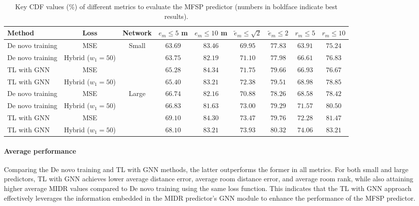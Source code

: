 \begin{table*}[ht]
    \centering
    \caption{Key CDF values (\%) of different metrics to evaluate the MFSP predictor (numbers in boldface indicate best results).}
    \begin{tabular}{lcccccccc}
        \toprule
        Method & Loss & Network  & $e_{m} \leq 5$ m & $e_{m} \leq 10$ m & $\tilde{e}_{m}\leq \sqrt{2}$ & $\tilde{e}_{m}\leq 2$ &  $r_{m} \leq 5$ & $r_{m}\leq 10$ \\
        \midrule
        De novo training  & MSE               & \multirow{4}{*}{Small} & $63.69$ & $83.46$ & $69.95$ & $77.83$ & $63.91$ & $75.24$ \\
        De novo training  & Hybrid ($w_1=50$) &                        & $63.75$ & $82.19$ & $71.10$ & $77.98$ & $66.61$ & $76.83$ \\
        TL with GNN       & MSE               &                        & $65.28$ & $\mathbf{84.34}$ & $71.75$ & $\mathbf{79.66}$ & $66.93$ & $76.67$ \\
        TL with GNN       & Hybrid ($w_1=50$) &                        & $\mathbf{65.40}$ & $83.21$ & $\mathbf{72.38}$ & $79.51$ & $\mathbf{68.98}$ & $\mathbf{78.85}$ \\
        \midrule
        De novo training  & MSE               & \multirow{4}{*}{Large} & $66.74$ & $82.16$ & $70.88$ & $78.26$ & $68.58$ & $78.42$ \\
        De novo training  & Hybrid ($w_1=50$) &                        & $66.83$ & $81.63$ & $73.00$ & $79.29$ & $71.57$ & $80.50$ \\
        TL with GNN       & MSE               &                        & $\mathbf{69.10}$ & $\mathbf{84.30}$ & $73.47$ & $79.76$ & $72.28$ & $81.47$ \\
        TL with GNN       & Hybrid ($w_1=50$) &                        & $68.10$ & $83.21$ & $\mathbf{73.93}$ & $\mathbf{80.32}$ & $\mathbf{74.06}$ & $\mathbf{83.21}$ \\
        \bottomrule
    \end{tabular}
    \label{tab:mfspp_eval_cdf}
\end{table*}

\paragraph{Average performance}
Comparing the De novo training and TL with GNN methods, the latter outperforms the former in all metrics. For both small and large predictors, TL with GNN achieves lower average distance error, average room distance error, and average room rank, while also attaining higher average MIDR values compared to De novo training using the same loss function. This indicates that the TL with GNN approach effectively leverages the information embedded in the MIDR predictor's GNN module to enhance the performance of the MFSP predictor.

